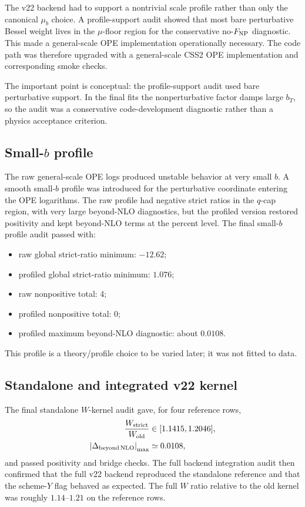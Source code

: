 \documentclass[11pt]{article}
\newcommand{\bt}{b_T}
\begin{document}
The v22 backend had to support a nontrivial scale profile rather than only the canonical $\mu_b$ choice.  A profile-support audit showed that most bare perturbative Bessel weight lives in the $\mu$-floor region for the conservative no-$F_{\rm NP}$ diagnostic.  This made a general-scale OPE implementation operationally necessary.  The code path was therefore upgraded with a general-scale CSS2 OPE implementation and corresponding smoke checks.

The important point is conceptual: the profile-support audit used bare perturbative support.  In the final fits the nonperturbative factor damps large $\bt$, so the audit was a conservative code-development diagnostic rather than a physics acceptance criterion.

\subsection{Small-$b$ profile}

The raw general-scale OPE logs produced unstable behavior at very small $b$.  A smooth small-$b$ profile was introduced for the perturbative coordinate entering the OPE logarithms.  The raw profile had negative strict ratios in the $q$-cap region, with very large beyond-NLO diagnostics, but the profiled version restored positivity and kept beyond-NLO terms at the percent level.  The final small-$b$ profile audit passed with:
\begin{itemize}
  \item raw global strict-ratio minimum: $-12.62$;
  \item profiled global strict-ratio minimum: $1.076$;
  \item raw nonpositive total: 4;
  \item profiled nonpositive total: 0;
  \item profiled maximum beyond-NLO diagnostic: about $0.0108$.
\end{itemize}
This profile is a theory/profile choice to be varied later; it was not fitted to data.

\subsection{Standalone and integrated v22 kernel}

The final standalone $W$-kernel audit gave, for four reference rows,
\begin{align}
  \frac{W_{\rm strict}}{W_{\rm old}} &\in [1.1415,1.2046],\\
  \left|\Delta_{\rm beyond\,NLO}\right|_{\max} &\simeq 0.0108,
\end{align}
and passed positivity and bridge checks.  The full backend integration audit then confirmed that the full v22 backend reproduced the standalone reference and that the scheme-$Y$ flag behaved as expected.  The full $W$ ratio relative to the old kernel was roughly $1.14$--$1.21$ on the reference rows.
\end{document}
